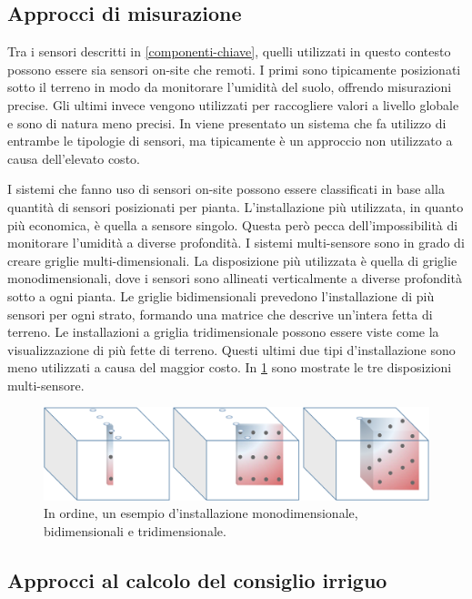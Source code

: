 \documentclass[12pt,a4paper,openright,twoside, openany]{book}
\begin{document}
\subsection{Approcci di misurazione}\label{approcci-misurazione}

Tra i sensori descritti in \cref{componenti-chiave}, quelli utilizzati in questo contesto possono essere sia sensori on-site che remoti.
I primi sono tipicamente posizionati sotto il terreno in modo da monitorare l'umidità del suolo, offrendo misurazioni precise.
Gli ultimi invece vengono utilizzati per raccogliere valori a livello globale e sono di natura meno precisi.
In \cite{Babaeian2021} viene presentato un sistema che fa utilizzo di entrambe le tipologie di sensori, ma tipicamente è un approccio non utilizzato a causa dell'elevato costo.

I sistemi che fanno uso di sensori on-site possono essere classificati in base alla quantità di sensori posizionati per pianta. L'installazione più utilizzata, in quanto più economica, è quella a sensore singolo. Questa però pecca dell'impossibilità di monitorare l'umidità a diverse profondità\cite{Arif2013}.
I sistemi multi-sensore sono in grado di creare griglie multi-dimensionali.
La disposizione più utilizzata è quella di griglie monodimensionali, dove i sensori sono allineati verticalmente a diverse profondità sotto a ogni pianta\cite{Karandish2016, Goldstein2017, Jimnez2020}.
Le griglie bidimensionali\cite{Egea2016, Cordeiro2016} prevedono l'installazione di più sensori per ogni strato, formando una matrice che descrive un'intera fetta di terreno.
Le installazioni a griglia tridimensionale\cite{ZapataSierra2021, Liang2021}  possono essere viste come la visualizzazione di più fette di terreno.
Questi ultimi due tipi d'installazione sono meno utilizzati a causa del maggior costo. In \cref{fig.griglie} sono mostrate le tre disposizioni multi-sensore.
\newpage
\begin{figure}[t]
    \centering\includegraphics[width=0.7\linewidth]{./figures/griglie.png}\caption{In ordine, un esempio d'installazione monodimensionale, bidimensionali e tridimensionale\cite{FRANCIA2022106924}.}\label{fig.griglie}
\end{figure}

\subsection{Approcci al calcolo del consiglio irriguo}\label{approcci-irrigazione}
\end{document}

